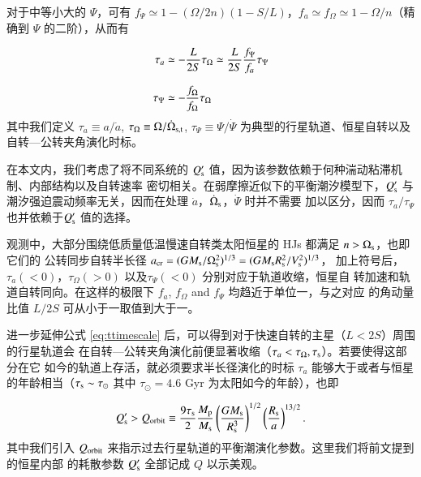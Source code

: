 对于中等小大的 $\Psi$，可有 $f_\Psi \simeq 1 - (\Omega/2n) (1-S/L)$，$f_a \simeq f_\Omega \simeq 1
 - \Omega/n$（精确到 $\Psi$ 的二阶），从而有
 
\begin{subequations} \label{eq:ttimescale}
\setlength{\jot}{10pt}
\begin{align}
    \tau_a &\simeq - \frac{L}{2S}\tau_\Omega \simeq \frac{L}{2S} \frac{f_\Psi}{f_a} \tau_\Psi \\
    \tau_\Psi &\simeq -\frac{f_\Omega}{f_\Omega} \tau_\Omega 
\end{align}
\end{subequations} 
其中我们定义 $\tau_a \equiv a /{\dot a}$,  $\tau_\Omega \equiv \Omega / {\dot \Omega}_{\mathrm{s, t}}$, 
$\tau_\Psi \equiv \Psi / {\dot \Psi}$ 为典型的行星轨道、恒星自转以及自转---公转夹角演化时标。

在本文内，我们考虑了将不同系统的 $Q_\mathrm{s}^\prime$ 值，因为该参数依赖于何种湍动粘滞机制\cite{
Zahn1977,Goldreich1989,Penev2007}、内部结构\cite{Terquem1998,Goodman2009}以及自转速率
\cite{Ogilvie2007,Barker2009}密切相关。在弱摩擦近似下的平衡潮汐模型下，$Q_\mathrm{s}^\prime$ 与
潮汐强迫震动频率无关，因而在处理 $\dot{a}$，$\dot{\Omega}_\mathrm{s}$，$\dot{\varPsi}$ 时并不需要
加以区分，因而 $\tau_a / \tau_\Psi$ 也并依赖于$Q_\mathrm{s}^\prime$ 值的选择。

观测中，大部分围绕低质量低温慢速自转类太阳恒星的 HJs 都满足 $n>\Omega_\mathrm{s}$，也即它们的
公转同步自转半长径 $a_\mathrm{cr} = (GM_\mathrm{s}/\Omega_\mathrm{s}^2)^{1/3} = (GM_\mathrm{s}R_\mathrm{s}^2/V_\mathrm{s}^2)^{1/3}$，
加上符号后，$\tau_a (<0)$，$\tau_\Omega (>0)$ 以及$\tau_\Psi (<0)$ 分别对应于轨道收缩，恒星自
转加速和轨道自转同向。在这样的极限下 $f_a$, $f_\Omega$ and $f_\Psi$ 均趋近于单位一，与之对应
的角动量比值 $L/2S$ 可从小于一取值到大于一。

进一步延伸公式 \ref{eq:ttimescale} 后，可以得到对于快速自转的主星（$L<2S$）周围的行星轨道会
在自转---公转夹角演化前便显著收缩（$\tau_a < \tau_{\Omega},\tau_\mathrm{s}$）。若要使得这部分在它
如今的轨道上存活，就必须要求半长径演化的时标 $\tau_a$ 能够大于或者与恒星的年龄相当（$\tau_
\mathrm{s}\sim \tau_\odot$ 其中 $\tau_\odot =4.6$ Gyr 为太阳如今的年龄），也即

\begin{equation} \label{eq:qorbit} 
Q_\mathrm{s}^\prime > Q_{\rm orbit} \equiv {9 \tau_\mathrm{s} \over 2} 
{M_\mathrm{p} \over M_\mathrm{s}}  \left( {G M_\mathrm{s} \over R_\mathrm{s}^3} \right)^{1/2}
\left({R_\mathrm{s} \over a} \right)^{13/2}.
\end{equation}  
其中我们引入 $Q_{\rm orbit}$ 来指示过去行星轨道的平衡潮演化参数。这里我们将前文提到的恒星内部
的耗散参数 $Q_\mathrm{s}^\prime $ 全部记成 $Q$ 以示美观。

